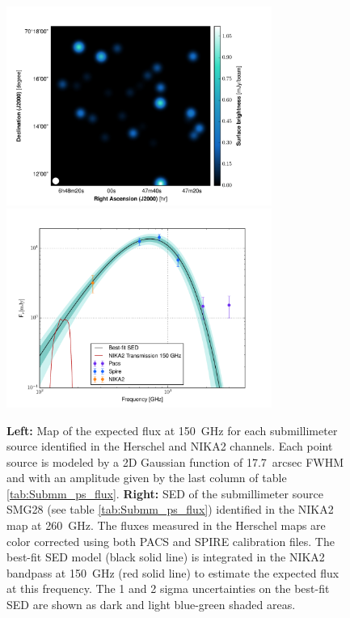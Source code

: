 \documentclass[traditabstract]{aa}
\begin{document}
\begin{figure}[h!]
\centering
\includegraphics[height=6.5cm]{Expected_pointsource_flux_2mm.pdf}
\includegraphics[height=6.5cm]{SED_source_NIKA2.pdf}
\caption{{\footnotesize \textbf{Left:} Map of the expected flux at 150~GHz for each submillimeter source identified in the Herschel and NIKA2 channels. Each point source is modeled by a 2D Gaussian function of 17.7~arcsec FWHM and with an amplitude given by the last column of table \ref{tab:Submm_ps_flux}. \textbf{Right:} SED of the submillimeter source SMG28 (see table \ref{tab:Submm_ps_flux}) identified in the NIKA2 map at 260~GHz. The fluxes measured in the Herschel maps are color corrected using both PACS \citep{pog10} and SPIRE calibration files. The best-fit SED model (black solid line) is integrated in the NIKA2 bandpass at 150~GHz (red solid line) to estimate the expected flux at this frequency. The 1 and 2 sigma uncertainties on the best-fit SED are shown as dark and light blue-green shaded areas.}}
\label{fig:Expected_pts_NIKA2}
\end{figure}
\end{document}
